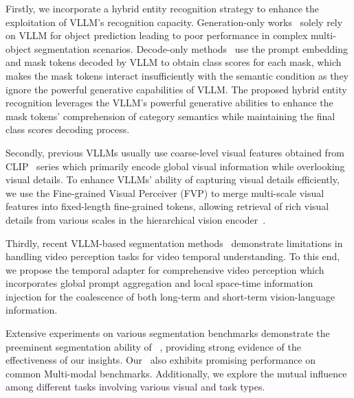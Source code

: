 Firstly, we incorporate a hybrid entity recognition strategy to enhance the exploitation of VLLM's recognition capacity.
Generation-only works~\cite{Lai2023LISARS,xia2023gsva, Ren2023PixelLMPR} solely rely on VLLM for object prediction leading to poor performance in complex multi-object segmentation scenarios.
Decode-only methods~\cite{zhang2024psalm,zhang2024omg} use the prompt embedding and mask tokens decoded by VLLM to obtain class scores for each mask, which makes the mask tokens interact insufficiently with the semantic condition as they ignore the powerful generative capabilities of VLLM.
The proposed hybrid entity recognition leverages the VLLM's powerful generative abilities to enhance the mask tokens' comprehension of category semantics while maintaining the final class scores decoding process.

Secondly, previous VLLMs usually use coarse-level visual features obtained from CLIP~\cite{radford2021learning} series which primarily encode global visual information while overlooking visual details. 
To enhance VLLMs' ability of capturing visual details efficiently, we use the Fine-grained Visual Perceiver (FVP) to merge multi-scale visual features into fixed-length fine-grained tokens, allowing retrieval of rich visual details from various scales in the hierarchical vision encoder~\cite{cheng2022masked}. 

Thirdly,  recent VLLM-based segmentation methods~\cite{Lai2023LISARS,zhang2024psalm,zhang2024omg} demonstrate limitations in handling video perception tasks for video temporal understanding. To this end, 
we propose the temporal adapter for comprehensive video perception which incorporates global prompt aggregation and local space-time information injection for the coalescence of both long-term and short-term vision-language information.

Extensive experiments on various segmentation benchmarks demonstrate the preeminent segmentation ability of \name~, providing strong evidence of the effectiveness of our insights. Our \name~also exhibits promising performance on common Multi-modal benchmarks. Additionally, we explore the mutual influence among different tasks involving various visual and task types. 

